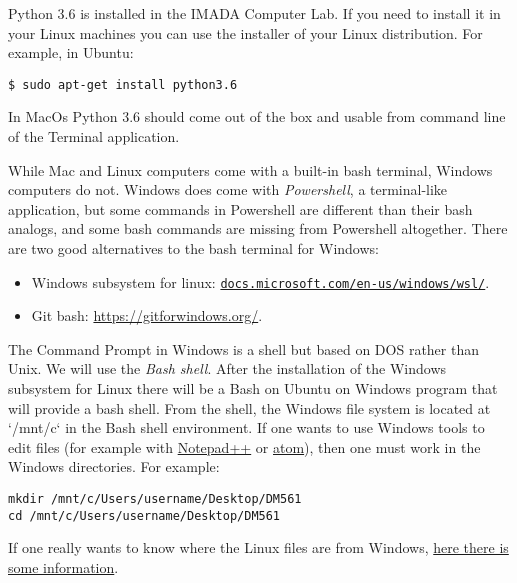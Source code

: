 Python 3.6 is installed in the IMADA Computer Lab. If you need to
install it in your Linux machines you can use the installer of your Linux
distribution. For example, in Ubuntu:

\begin{lstlisting}
$ sudo apt-get install python3.6
\end{lstlisting}

In MacOs Python 3.6 should come out of the box and usable from command
line of the Terminal application.



\begin{info}
While Mac and Linux computers come with a built-in bash terminal, Windows computers do not.
Windows does come with \emph{Powershell}, a terminal-like application, but some commands in Powershell are different than their bash analogs, and some bash commands are missing from Powershell altogether.
There are two good alternatives to the bash terminal for Windows:
\begin{itemize}
\item Windows subsystem for linux: \href{https://docs.microsoft.com/en-us/windows/wsl/install-win10}{\texttt{docs.microsoft.com/en-us/windows/wsl/}}.
\item Git bash: \url{https://gitforwindows.org/}.
\end{itemize}
\end{info}



The Command Prompt in Windows is a shell but based on DOS rather than
Unix.  We will use the \emph{Bash shell}. After the installation of the
Windows subsystem for Linux there will be a Bash on Ubuntu on Windows
program that will provide a bash shell. From the shell, the Windows file system is located
at `/mnt/c` in the Bash shell environment. If one wants to use Windows
tools to edit files (for example with
\href{https://notepad-plus-plus.org/}{Notepad++} or
\href{https://atom.io/}{atom}), then one must work in the Windows
directories. For example:

\begin{lstlisting}
mkdir /mnt/c/Users/username/Desktop/DM561
cd /mnt/c/Users/username/Desktop/DM561
\end{lstlisting}

If one really wants to know where the Linux files are from Windows,
\href{https://www.howtogeek.com/261383/how-to-access-your-ubuntu-bash-files-in-windows-and-your-windows-system-drive-in-bash/}{here there is some information}.



